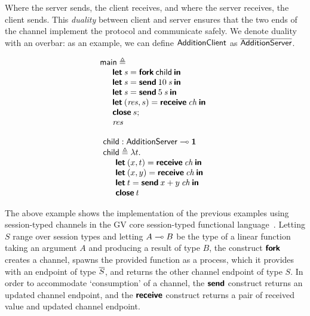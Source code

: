 \documentclass[
graybox,
envcountchap
]{svmult}
\begin{document}
\begin{bibunit}
  Where the server sends, the client receives, and where the server receives,
  the client sends. This \emph{duality} between client and server ensures that
  the two ends of the channel implement the protocol and communicate safely.
  We denote duality with an overbar: as an example, we can define
  $\mathsf{AdditionClient}$ as $\overline{\mathsf{AdditionServer}}$.

  \begin{minipage}[t]{0.45\textwidth}
  \[
    \begin{array}{l}
    \mathsf{main} \triangleq \\
    \quad
      \begin{array}{l}
        \textbf{\textsf{let}} \: \mathit{s} = \textbf{\textsf{fork}} \: \mathsf{child} \: \textbf{\textsf{in}} \\
        \textbf{\textsf{let}} \: \mathit{s} = \textbf{\textsf{send}} \: 10 \: \mathit{s} \: \textbf{\textsf{in}} \\
        \textbf{\textsf{let}} \: \mathit{s} = \textbf{\textsf{send}} \: 5 \: \mathit{s} \: \textbf{\textsf{in}} \\
        \textbf{\textsf{let}} \: (\mathit{res}, s) = \textbf{\textsf{receive}} \: \mathit{ch} \: \textbf{\textsf{in}} \\
        \textbf{\textsf{close}} \: s; \\
        \mathit{res}
      \end{array}
    \end{array}
  \]
\end{minipage}
\hfill
\begin{minipage}[t]{0.45\textwidth}
  \[
    \begin{array}{l}
    \mathsf{child} : \mathsf{AdditionServer} \multimap \mathbf{1} \\
    \mathsf{child} \triangleq \lambda t .\\
    \quad
      \begin{array}{l}
      \textbf{\textsf{let}} \: (x, t) = \textbf{\textsf{receive}} \: \mathit{ch} \: \textbf{\textsf{in}} \\
      \textbf{\textsf{let}} \: (x, y) = \textbf{\textsf{receive}} \: \mathit{ch} \: \textbf{\textsf{in}} \\
      \textbf{\textsf{let}} \: t = \textbf{\textsf{send}} \: x + y \: \mathit{ch} \: \textbf{\textsf{in}} \\
      \textbf{\textsf{close}} \: t
      \end{array}
    \end{array}
  \]
\end{minipage}

  The above example shows the implementation of the previous examples using
  session-typed channels in the GV core session-typed
  functional language~\cite{GayV10:last, Wadler14:prop-sessions,
  LindleyM15:semantics}. Letting $S$ range over session types and letting
  $A \multimap B$ be the type of a linear function taking an argument $A$ and
  producing a result of type $B$, the  construct $\textbf{\textsf{fork}}$
  creates a channel, spawns the provided function as a process, which it provides with an endpoint of
  type $\overline{S}$, and returns the other channel endpoint of type $S$.
  In order to accommodate `consumption' of a channel, the
  $\textbf{\textsf{send}}$ construct returns an updated channel endpoint, and the
  $\textbf{\textsf{receive}}$ construct returns a pair of received value and updated
  channel endpoint.


\end{bibunit}
\end{document}
